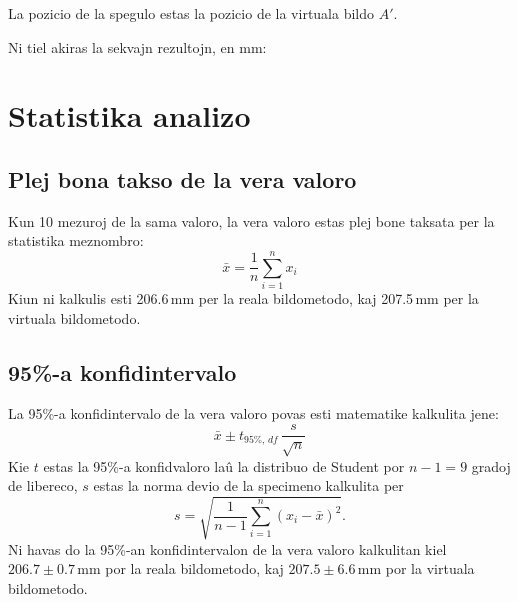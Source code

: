 \documentclass[a4paper,11pt]{article}
\begin{document}
La pozicio de la spegulo estas la pozicio de la virtuala bildo $A'$.

Ni tiel akiras la sekvajn rezultojn, en mm:

\begin{table}[h]
  \centering
  \caption{Datumoj de mezurado per virtuala bildo (distancoj en mm).}
\end{table}

\section{Statistika analizo}

\subsection{Plej bona takso de la vera valoro}

Kun 10 mezuroj de la sama valoro, la vera valoro estas plej bone taksata per la statistika meznombro:
\[
  \bar{x} = \frac{1}{n}\sum_{i=1}^{n} x_i
\]
Kiun ni kalkulis esti 206.6\,mm per la reala bildometodo, kaj 207.5\,mm per la virtuala bildometodo.

\subsection{95\%-a konfidintervalo}

La 95\%-a konfidintervalo de la vera valoro povas esti matematike kalkulita jene:
\[
  \bar{x} \pm t_{95\%,\,df}\,\frac{s}{\sqrt{n}}
\]
Kie $t$ estas la 95\%-a konfidvaloro la\^{u} la distribuo de Student por $n-1=9$ gradoj de libereco, $s$ estas la norma devio de la specimeno kalkulita per
\[
  s = \sqrt{\frac{1}{n-1}\sum_{i=1}^{n}(x_i-\bar{x})^2}.
\]
Ni havas do la 95\%-an konfidintervalon de la vera valoro kalkulitan kiel $206.7 \pm 0.7$\,mm por la reala bildometodo, kaj $207.5 \pm 6.6$\,mm por la virtuala bildometodo.
\end{document}
